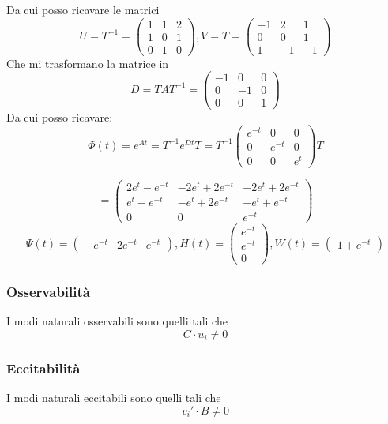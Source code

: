 \documentclass{article}
\begin{document}
Da cui posso ricavare le matrici \[U=T^{-1} = \left(\begin{matrix}1 & 1 & 2\\1 & 0 & 1\\0 & 1 & 0\end{matrix}\right), V = T = \left(\begin{matrix}-1 & 2 & 1\\0 & 0 & 1\\1 & -1 & -1\end{matrix}\right)\]
Che mi trasformano la matrice in \[ D = TAT^{-1} = \left(\begin{matrix}-1 & 0 & 0\\0 & -1 & 0\\0 & 0 & 1\end{matrix}\right) \]
Da cui posso ricavare: \[ \Phi(t) = e^{At} = T^{-1} e^{Dt} T =  T^{-1} \left(\begin{matrix}e^{- t} & 0 & 0\\0 & e^{- t} & 0\\0 & 0 & e^{t}\end{matrix}\right) T\]

\[ = \left(\begin{matrix}2 e^{t} - e^{- t} & - 2 e^{t} + 2 e^{- t} & - 2 e^{t} + 2 e^{- t}\\e^{t} - e^{- t} & - e^{t} + 2 e^{- t} & - e^{t} + e^{- t}\\0 & 0 & e^{- t}\end{matrix}\right) \]\[ \Psi(t) = \left(\begin{matrix}- e^{- t} & 2 e^{- t} & e^{- t}\end{matrix}\right), H(t) =  \left(\begin{matrix}e^{- t}\\e^{- t}\\0\end{matrix}\right),W(t) = \left(\begin{matrix}1 + e^{- t}\end{matrix}\right)\]\subsubsection{Osservabilità}
 I modi naturali osservabili sono quelli tali che 
\[ C \cdot u_i   \neq 0\]
\subsubsection{Eccitabilità}
 I modi naturali eccitabili sono quelli tali che 
\[v_i' \cdot B \neq 0\]
\end{document}
